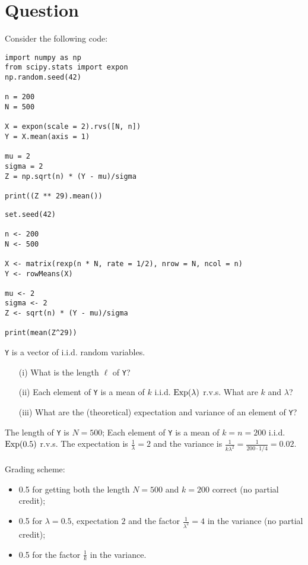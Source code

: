 \section*{Question}

Consider the following code:

\begin{verbatim}
import numpy as np
from scipy.stats import expon
np.random.seed(42)

n = 200
N = 500

X = expon(scale = 2).rvs([N, n])
Y = X.mean(axis = 1)

mu = 2
sigma = 2
Z = np.sqrt(n) * (Y - mu)/sigma

print((Z ** 29).mean())
\end{verbatim}

\begin{verbatim}
set.seed(42)

n <- 200
N <- 500

X <- matrix(rexp(n * N, rate = 1/2), nrow = N, ncol = n)
Y <- rowMeans(X)

mu <- 2
sigma <- 2
Z <- sqrt(n) * (Y - mu)/sigma

print(mean(Z^29))
\end{verbatim}

\vspace*{20pt}


\begin{exercise}[1.5]
\texttt{Y} is a vector of i.i.d. random variables.

\begin{itemize}
\item[(i)] What is the length $\ell$ of \texttt{Y}?
\item[(ii)] Each element of \texttt{Y} is a mean of $k$ i.i.d. $\mathrm{Exp}(\lambda)$ r.v.s.
What are $k$ and $\lambda$?  
\item[(iii)] What are the (theoretical) expectation and variance of an element of \texttt{Y}? 
\end{itemize} 

\begin{solution}
The length of \texttt{Y} is $N = 500$;  Each element of \texttt{Y} is a mean of $k = n = 200$ i.i.d. $\mathrm{Exp}(0.5)$ r.v.s.
The expectation is $\frac1\lambda = 2$ and the variance is $\frac1{k \lambda^2} = \frac1{200\cdot1/4} = 0.02$. \\ \\
Grading scheme:
\begin{itemize}
\item 0.5 for getting both the length $N=500$ and  $k=200$ correct (no partial credit);
\item 0.5 for $\lambda = 0.5$, expectation $2$ and the factor $\frac1{\lambda^2} = 4$ in the variance (no partial credit);
\item 0.5 for the factor $\frac1{k}$ in the variance.
\end{itemize}
\end{solution}
\end{exercise}

